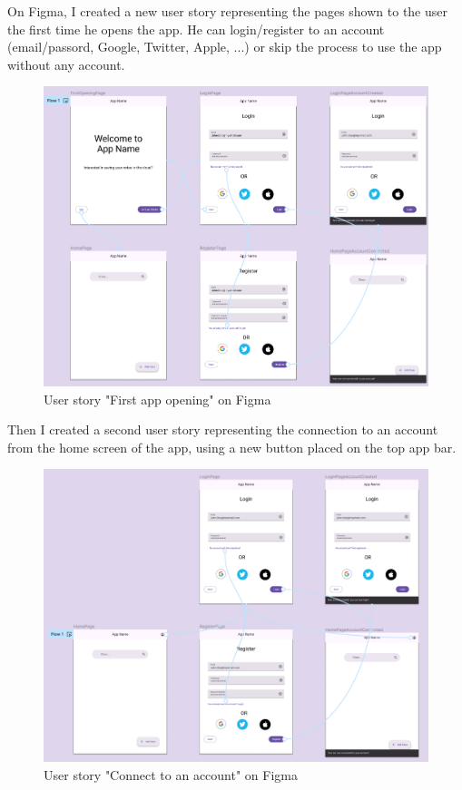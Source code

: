 \documentclass[]{article}
\begin{document}
	On Figma, I created a new user story representing the pages shown to the user the first time he opens the app. He can login/register to an account (email/passord, Google, Twitter, Apple, ...) or skip the process to use the app without any account.
	
	\begin{figure}[!htb]
		\centering
		\includegraphics[scale=0.4]{figma_first_app_opening}
		\caption{User story "First app opening" on Figma}
	\end{figure}
	
	\pagebreak
	
	Then I created a second user story representing the connection to an account from the home screen of the app, using a new button placed on the top app bar.
	
	\begin{figure}[!htb]
		\centering
		\includegraphics[scale=0.4]{figma_connect_account}
		\caption{User story "Connect to an account" on Figma}
	\end{figure}
	
\end{document}
